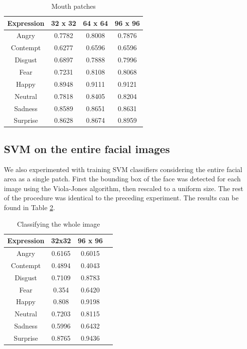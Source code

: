 \begin{table}
\caption{Mouth patches}
\label{table:mouth}

\begin{tabular}{| c | c | c | c |}
\hline
Expression & 32 x 32 &  64 x 64  & 96 x 96  \\

\hline
Angry	&	0.7782	&	0.8008	&	0.7876	\\
Contempt	&	0.6277	&	0.6596	& 0.6596 \\
Disgust	&	0.6897	&	0.7888	&	0.7996	\\
Fear	&	0.7231	&	0.8108	&	0.8068	\\
Happy	&	0.8948	&	0.9111	&	0.9121	\\
Neutral	&	0.7818	&	0.8405	&	0.8204	\\
Sadness	&	0.8589	&	0.8651	&	0.8631	\\
Surprise &	0.8628	&	0.8674	&	0.8959	\\

\hline
\end{tabular}
\end{table}

\subsection{SVM on the entire facial images}
We also experimented with training SVM classifiers considering the entire facial area as a single patch. First the bounding box of the face was detected
for each image using the Viola-Jones algorithm, then rescaled to a uniform size. %
The rest of the procedure was identical to the preceding experiment. The results can be found in Table \ref{table:entire_images}.

\begin{table}
\caption{Classifying the whole image}
\label{table:entire_images}

\begin{tabular}{| c | c | c | c |}
\hline
Expression & 32x32 & 96 x 96  \\

\hline
Angry	 & 0.6165 & 0.6015	\\
Contempt & 0.4894 & 0.4043	\\
Disgust	 & 0.7109 & 0.8783	\\
Fear	 & 0.354  & 0.6420	\\
Happy	 & 0.808  & 0.9198	\\
Neutral	 & 0.7203 & 0.8115	\\
Sadness	 & 0.5996 & 0.6432	\\
Surprise & 0.8765 & 0.9436	\\

\hline
\end{tabular}
\end{table}

